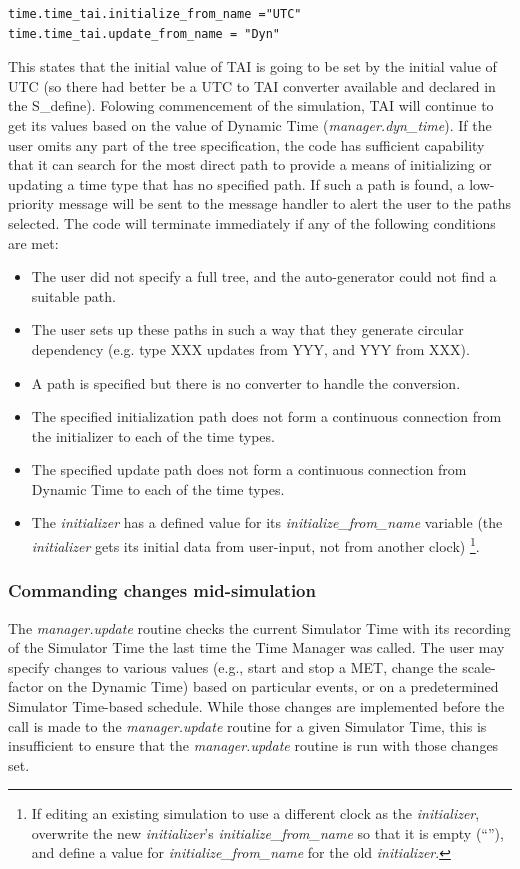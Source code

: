 \begin{verbatim}
time.time_tai.initialize_from_name ="UTC"
time.time_tai.update_from_name = "Dyn"
\end{verbatim}

This states that the initial value of TAI is going to be set by
the initial value of UTC (so there had better be a
UTC to TAI converter available and declared in the S\_define).  Folowing commencement of the simulation, TAI will continue to get its
values based on the value of Dynamic Time (\textit{manager.dyn\_time}). If
the user omits any part of the tree specification, the code has
sufficient capability that it can search for the most direct path to
provide a means of initializing or updating a time type that has no
specified path.  If such a path is found, a low-priority message will
be sent to the message handler to alert the user to the paths selected.
 The code will terminate immediately if any of the following conditions
are met:


\begin{itemize}
\item The user did not specify a full tree, and the auto-generator could
not find a suitable path.
\item The user sets up these paths in such a way that they generate
circular dependency (e.g. type XXX updates from YYY, and YYY from XXX).
\item A path is specified but there is no converter to handle the
conversion.
\item The specified initialization path does not form a continuous
connection from the initializer to each of the time types.
\item The specified update path does not form a continuous connection
from Dynamic Time to each of the time types.
\item The \textit{initializer} has a defined value for its
\textit{initialize\_from\_name} variable
(the \textit{initializer} gets its
initial data from user-input, not from another clock)
\footnote{If editing an existing simulation to use a different clock as the
\textit{initializer}, overwrite the new \textit{initializer}'s
\textit{initialize\_from\_name} so that it is empty (``''), and define a
value for \textit{initialize\_from\_name} for the old \textit{initializer}.}.
\end{itemize}

\subsubsection{Commanding changes mid-simulation}
The \textit{manager.update} routine checks the current Simulator Time with its recording of the Simulator Time the last time the Time Manager was called.
The user may specify changes to various values (e.g., start and stop a MET, change the scale-factor on the Dynamic Time) based on particular events, or on a predetermined Simulator Time-based schedule.  While those changes are implemented before the call is made to the \textit{manager.update} routine for a given Simulator Time, this is insufficient to ensure that the \textit{manager.update} routine is run with those changes set.

